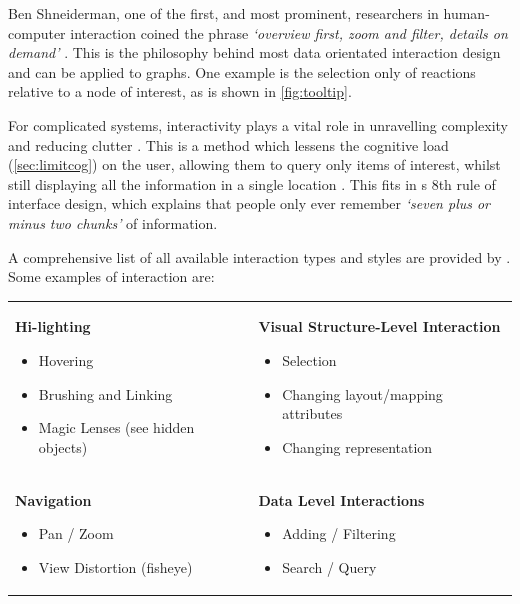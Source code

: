 Ben Shneiderman, one of the first, and most prominent, researchers in human-computer interaction coined the phrase \emph{`overview first, zoom and filter, details on demand'}  \citep{mantra}. This is the philosophy behind most data orientated interaction design and can be applied to graphs. One example is the selection only of reactions relative to a node of interest, as is shown in \autoref{fig:tooltip}.

For complicated systems, interactivity plays a vital role in unravelling complexity and reducing clutter \citep{interaction1}. This is a method which lessens the cognitive load (\autoref{sec:limitcog}) on the user, allowing them to query only items of interest, whilst still displaying all the information in a single location \citep{oneplace}. This fits in \cite{rule8}s 8th rule of interface design, which explains that people only ever remember \emph{`seven plus or minus two chunks'} of information. 

A comprehensive list of all available interaction types and styles are provided by \cite{ch6}. Some examples of interaction are:\\ 

\begin{table}[h]
    \centering
    \begin{tabular}{p{}p{}}
\textbf{Hi-lighting}
\begin{itemize}
\item Hovering
\item Brushing and Linking
\item Magic Lenses (see hidden objects)
\end{itemize}
&
\textbf{Visual Structure-Level Interaction}
\begin{itemize}
\item Selection
\item Changing layout/mapping attributes
\item Changing representation
\end{itemize}
\\
\textbf{Navigation}
\begin{itemize}
\item Pan / Zoom
\item View Distortion (fisheye)
\end{itemize}
&
\textbf{Data Level Interactions}
\begin{itemize}
\item Adding / Filtering
\item Search / Query
\end{itemize}

\end{tabular}
    \label{tab:interactive}
\end{table}

